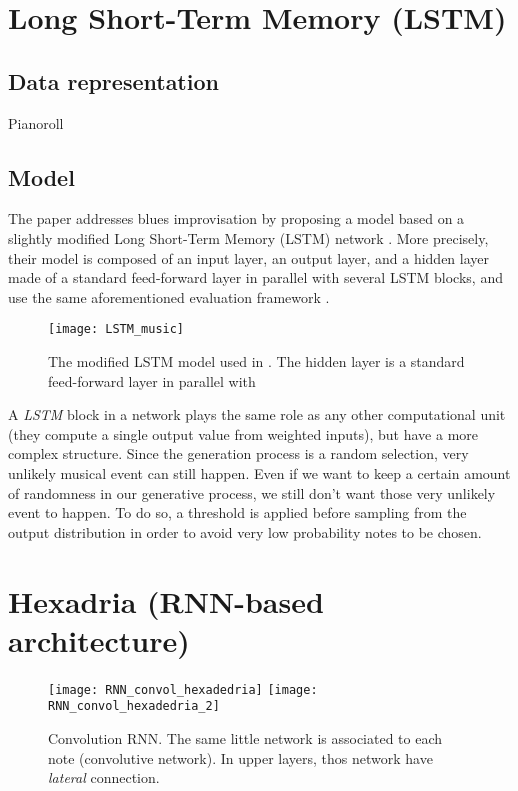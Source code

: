 \documentclass{report}
\begin{document}
\section{Long Short-Term Memory (LSTM)}
\subsection{Data representation}
Pianoroll
\subsection{Model}
The paper \cite{eck2008learning} addresses blues improvisation by proposing a model based on a slightly modified Long Short-Term Memory (LSTM) network \cite{eck2002finding}. More precisely, their model is composed of an input layer, an output layer, and a hidden layer made of a standard feed-forward layer in parallel with several LSTM blocks, and use the same aforementioned evaluation framework \cite{DBLP:journals/corr/LiuR14a}.
\begin{figure}
\centering
\texttt{[image: LSTM\_music]}
\caption{The modified LSTM model used in \cite{eck2008learning}. The hidden layer is a standard feed-forward layer in parallel with }
\label{fig:LSTM_music}
\end{figure}
A \textit{LSTM} block in a network plays the same role as any other computational unit (they compute a single output value from weighted inputs), but have a more complex structure.
Since the generation process is a random selection, very unlikely musical event can still happen. Even if we want to keep a certain amount of randomness in our generative process, we still don't want those very unlikely event to happen. To do so, a threshold is applied before sampling from the output distribution in order to avoid very low probability notes to be chosen.

\section{Hexadria (RNN-based architecture)}
\begin{figure}
\centering
\texttt{[image: RNN\_convol\_hexadedria]}
\texttt{[image: RNN\_convol\_hexadedria\_2]}
\caption{Convolution RNN. The same little network is associated to each note (convolutive network). In upper layers, thos network have \textit{lateral} connection.}
\label{RNN-hexadria}
\end{figure}
\end{document}
